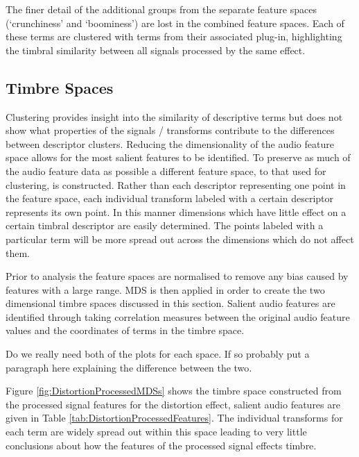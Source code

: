 		The finer detail of the additional groups from the separate feature spaces (`crunchiness' and `boominess')
		are lost in the combined feature spaces. Each of these terms are clustered with terms from their associated
		plug-in, highlighting the timbral similarity between all signals processed by the same effect.

	\subsection{Timbre Spaces}
	\label{sec:TimbreEvaluation-Analysis-TimbreSpaces}
		Clustering provides insight into the similarity of descriptive terms but does not show what properties of
		the signals / transforms contribute to the differences between descriptor clusters. Reducing the
		dimensionality of the audio feature space allows for the most salient features to be identified. To preserve
		as much of the audio feature data as possible a different feature space, to that used for clustering, is
		constructed. Rather than each descriptor representing one point in the feature space, each individual
		transform labeled with a certain descriptor represents its own point. In this manner dimensions which have
		little effect on a certain timbral descriptor are easily determined. The points labeled with a particular
		term will be more spread out across the dimensions which do not affect them. 
		
		Prior to analysis the feature spaces are normalised to remove any bias caused by features with a large
		range. MDS is then applied in order to create the two dimensional timbre spaces discussed in this section.
		Salient audio features are identified through taking correlation measures between the original audio feature
		values and the coordinates of terms in the timbre space.

		\note
		{
			Do we really need both of the plots for each space. If so probably put a paragraph here explaining
			the difference between the two.
		}

		Figure \ref{fig:DistortionProcessedMDSs} shows the timbre space constructed from the processed signal
		features for the distortion effect, salient audio features are given in Table
		\ref{tab:DistortionProcessedFeatures}. The individual transforms for each term are widely spread out within
		this space leading to very little conclusions about how the features of the processed signal effects timbre.

